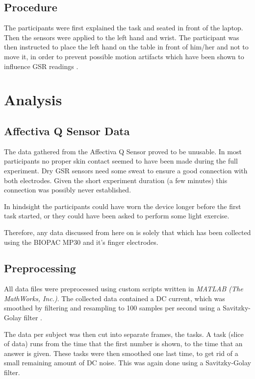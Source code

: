 \documentclass[11pt,leqno,a4paper]{report} %
\begin{document}
\subsection{Procedure}
The participants were first explained the task and seated in front of the laptop. Then the sensors were applied to the left hand and wrist. The participant was then instructed to place the left hand on the table in front of him/her and not to move it, in order to prevent possible motion artifacts which have been shown to influence GSR readings \citep{motionart}.

\section{Analysis}

\subsection{Affectiva Q Sensor Data}
The data gathered from the Affectiva Q Sensor proved to be unusable. In most participants no proper skin contact seemed to have been made during the full experiment. Dry GSR sensors need some sweat to ensure a good connection with both electrodes. Given the short experiment duration (a few minutes) this connection was possibly never established.

In hindsight the participants could have worn the device longer before the first task started, or they could have been asked to perform some light exercise. 

Therefore, any data discussed from here on is solely that which has been collected using the BIOPAC MP30 and it's finger electrodes.


\subsection{Preprocessing}
All data files were preprocessed using custom scripts written in \emph{MATLAB (The MathWorks, Inc.)}. The collected data contained a DC current, which was smoothed by filtering and resampling to 100 samples per second using a Savitzky-Golay filter \citep{savitzky1964smoothing}. 

The data per subject was then cut into separate frames, the tasks. A task (slice of data) runs from the time that the first number is shown, to the time that an answer is given. These tasks were then smoothed one last time, to get rid of a small remaining amount of DC noise. This was again done using a Savitzky-Golay filter.
\end{document}
